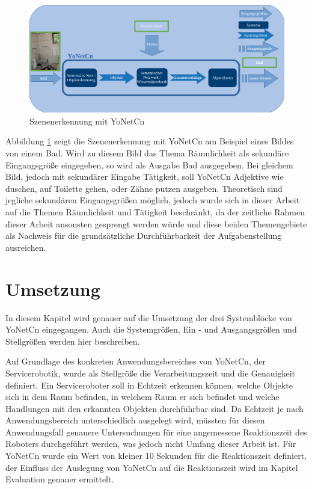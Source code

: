 \begin{figure}[h]
	
	\begin{center}
		
		\includegraphics[width=14cm]{images/Masteridee_2.png}
		
		\caption{Szenenerkennung mit YoNetCn}
		
		\label{system_Bild2}
		
	\end{center}
	
	
\end{figure}


Abbildung \ref{system_Bild2} zeigt die Szenenerkennung mit YoNetCn am Beispiel eines Bildes von einem Bad. Wird zu diesem Bild das Thema Räumlichkeit als sekundäre Eingangsgröße eingegeben, so wird als Ausgabe Bad ausgegeben. Bei gleichem Bild, jedoch mit sekundärer Eingabe Tätigkeit, soll YoNetCn Adjektive wie duschen, auf Toilette gehen, oder Zähne putzen ausgeben. Theoretisch sind jegliche sekundären Eingangsgrößen möglich, jedoch wurde sich in dieser Arbeit auf die Themen Räumlichkeit und Tätigkeit beschränkt, da der zeitliche Rahmen dieser Arbeit ansonsten gesprengt werden würde und diese beiden Themengebiete als Nachweis für die grundsätzliche Durchführbarkeit der Aufgabenstellung ausreichen. 

\section{Umsetzung}
\label{sec:umsetzung}

In diesem Kapitel wird genauer auf die Umsetzung der drei Systemblöcke von YoNetCn eingegangen. Auch die Systemgrößen, Ein - und Ausgangsgrößen und Stellgrößen werden hier beschreiben. 



Auf Grundlage des konkreten Anwendungsbereiches von YoNetCn, der Servicerobotik, wurde als Stellgröße die Verarbeitungszeit und die Genauigkeit definiert. Ein Serviceroboter soll in Echtzeit erkennen können, welche Objekte sich in dem  Raum befinden, in welchem Raum er sich befindet und welche Handlungen mit den erkannten Objekten durchführbar sind. Da Echtzeit je nach Anwendungsbereich unterschiedlich ausgelegt wird, müssten für diesen Anwendungsfall genauere Untersuchungen für eine angemessene Reaktionszeit des Roboters durchgeführt werden, was jedoch nicht Umfang dieser Arbeit ist. Für YoNetCn wurde ein Wert von kleiner 10 Sekunden für die Reaktionszeit definiert, der Einfluss der Auslegung von YoNetCn auf die Reaktionszeit wird im Kapitel Evaluation genauer ermittelt. 

